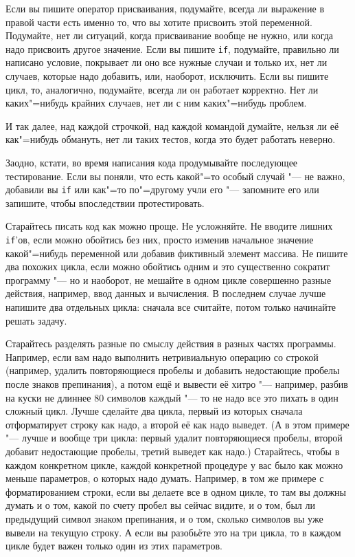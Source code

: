 \documentclass[a4paper,10pt]{problems}
\begin{document}
Если вы пишите оператор присваивания, подумайте, всегда ли выражение в правой части есть именно то, что вы хотите присвоить этой переменной. 
Подумайте, нет ли ситуаций, когда присваивание вообще не нужно, или когда надо присвоить другое значение. 
Если вы пишите \verb'if', подумайте, правильно ли написано условие, покрывает ли оно все нужные случаи и только их, нет ли случаев, которые надо добавить,
или, наоборот, исключить.
Если вы пишите цикл, то, аналогично, подумайте, всегда ли он работает корректно. 
Нет ли каких"=нибудь крайних случаев, нет ли с ним каких"=нибудь проблем.

И так далее, над каждой строчкой, над каждой командой думайте, нельзя ли её как"=нибудь обмануть, нет ли таких тестов, когда это будет работать неверно.

Заодно, кстати, во время написания кода продумывайте последующее тестирование. 
Если вы поняли, что есть какой"=то особый случай "--- не важно, добавили вы \verb'if' или как"=то по"=другому учли его "--- 
запомните его или запишите, чтобы впоследствии протестировать.

Старайтесь писать код как можно проще. Не усложняйте. 
Не вводите лишних \verb'if''ов, если можно обойтись без них, просто изменив начальное значение какой"=нибудь переменной или добавив фиктивный элемент массива.
Не пишите два похожих цикла, если можно обойтись одним и это существенно сократит программу "--- 
но и наоборот, не мешайте в одном цикле совершенно разные действия, например, ввод данных и вычисления. 
В последнем случае лучше напишите два отдельных цикла: сначала все считайте, потом только начинайте решать задачу.

Старайтесь разделять разные по смыслу действия в разных частях программы. 
Например, если вам надо выполнить нетривиальную операцию со строкой (например, удалить повторяющиеся пробелы и добавить недостающие пробелы после знаков препинания),
а потом ещё и вывести её хитро "--- например, разбив на куски не длиннее 80 символов каждый "--- то не надо все это пихать в один сложный цикл.
Лучше сделайте два цикла, первый из которых сначала отформатирует строку как надо, а второй её как надо выведет.
(А в этом примере "--- лучше и вообще три цикла: первый удалит повторяющиеся пробелы, второй добавит недостающие пробелы, третий выведет как надо.)
Старайтесь, чтобы в каждом конкретном цикле, каждой конкретной процедуре у вас было как можно меньше параметров, о которых надо думать. 
Например, в том же примере с форматированием строки, если вы делаете все в одном цикле, то там вы должны думать и о том, какой по счету пробел вы сейчас видите,
и о том, был ли предыдущий символ знаком препинания, и о том, сколько символов вы уже вывели на текущую строку. 
А если вы разобьёте это на три цикла, то в каждом цикле будет важен только один из этих параметров.
\end{document}
